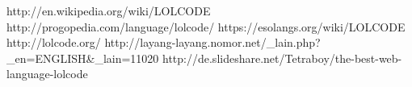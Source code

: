 \begin{thebibliography}{3}
   http://en.wikipedia.org/wiki/LOLCODE
   http://progopedia.com/language/lolcode/
   https://esolangs.org/wiki/LOLCODE
   http://lolcode.org/
   http://layang-layang.nomor.net/\_lain.php?\_en=ENGLISH\&\_lain=11020
   http://de.slideshare.net/Tetraboy/the-best-web-language-lolcode
\end{thebibliography}
